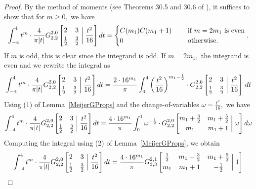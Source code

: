 \documentclass[12pt]{amsart}
\theoremstyle{definition}
\theoremstyle{remark}
\numberwithin{equation}{section}
\begin{document}
\begin{proof}
    By the method of moments (see Theorems 30.5 and 30.6 of \cite{Billingsley}), it suffices to show that for $m\geq 0,$ we have
    $$
    \int_{-4}^4 t^m\cdot\frac{4}{\pi |t|} G_{2,2}^{2,0} \left[\begin{matrix} 2 & 3 \smallskip \\  \frac{1}{2} &  \frac{3}{2}\end{matrix} \; \bigg| \; \frac{t^2}{16}\right]dt= \begin{cases}
        C(m_1)C(m_1+1) &\ \ \ \text{ if } m=2m_1\text{ is even}\\
        0 &\ \ \ \text{ otherwise}.
    \end{cases}.
    $$
    If $m$ is odd, this is clear since the integrand is odd. If $m=2m_1,$ the integrand is even and we rewrite the integral as
    $$
    \int_{-4}^4 t^m\cdot\frac{4}{\pi |t|} G_{2,2}^{2,0} \left[\begin{matrix} 2 & 3 \smallskip \\  \frac{1}{2} & \frac{3}{2}\end{matrix} \; \bigg| \; \frac{t^2}{16}\right]dt = \frac{2\cdot 16^{m_1}}{\pi}\int_{0}^{4} \left(\frac{t^2}{16}\right)^{m_1-\frac{1}{2}} \cdot G_{2,2}^{2,0}\left[\begin{matrix}2 & 3\smallskip \\  \frac{1}{2} & \frac{3}{2}\end{matrix} \; \bigg| \; \frac{t^2}{16} \right] \, dt
    $$
    Using (1) of Lemma~\ref{MeijerGProps} and the change-of-variables $\omega=\frac{t^2}{16},$ we have
    $$
     \int_{-4}^4 t^m\cdot\frac{4}{\pi |t|} G_{2,2}^{2,0} \left[\begin{matrix} 2 & 3 \smallskip \\  \frac{1}{2} & \frac{3}{2}\end{matrix} \; \bigg| \; \frac{t^2}{16}\right]dt =\frac{4 \cdot 16^{m_1}}{\pi} \int_{0}^{1} \omega^{-\frac{1}{2}} \cdot G_{2,2}^{2,0}\left[\begin{matrix}m_1 + \frac{3}{2} &  m_1 + \frac{5}{2}\smallskip \\  m_1 & m_1 + 1\end{matrix} \; \bigg| \; \omega \right] d \omega
    $$
    Computing the integral using (2) of Lemma~\ref{MeijerGProps}, we obtain
    $$
    \int_{-4}^4 t^m\cdot\frac{4}{\pi |t|} G_{2,2}^{2,0} \left[\begin{matrix} 2 & 3 \smallskip \\  \frac{1}{2} & \frac{3}{2}\end{matrix} \; \bigg| \; \frac{t^2}{16}\right]dt = \frac{4 \cdot 16^{m_1}}{\pi} G_{3,3}^{2,1} \left[\begin{matrix}\frac{1}{2} & m_1 + \frac{3}{2} & m_1 + \frac{5}{2}\smallskip \\  m_1 & m_1 + 1 & - \frac{1}{2}\end{matrix} \; \bigg| \; 1 \right]
$$
\end{proof}
\end{document}
